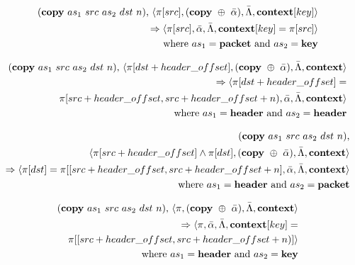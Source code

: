 \begin{equation}
\begin{split}
  (\textrm{\textbf{copy}} \ as_1 \ src \ as_2 \ dst \ n)
  \textrm{,} \ \langle \pi[src], (\textrm{\textbf{copy}} \ \oplus \ \bar \alpha), \bar \Lambda, \textrm{\textbf{context}}[key] \rangle \\
  \Rightarrow
  \langle \pi[src], \bar \alpha, \bar \Lambda, \textrm{\textbf{context}}[key] = \pi[src] \rangle \\
    \textrm{where} \ as_1 = \textrm{\textbf{packet} and } as_2 =
    \textrm{\textbf{key}}
\end{split}
\end{equation}

\begin{equation}
\begin{split}
  (\textrm{\textbf{copy}} \ as_1 \ src \ as_2 \ dst \ n)
  \textrm{,} \ \langle \pi[dst + header\_offset], (\textrm{\textbf{copy}} \ \oplus \ \bar \alpha), \bar \Lambda, \textrm{\textbf{context}} \rangle \\
  \Rightarrow
  \langle \pi[dst + header\_offset] = \\ \pi[src + header\_offset, src + header\_offset + n),
  \bar \alpha, \bar \Lambda, \textrm{\textbf{context}} \rangle \\
    \textrm{where} \ as_1 = \textrm{\textbf{header} and } as_2 =
    \textrm{\textbf{header}}
\end{split}
\end{equation}

\begin{equation}
\begin{split}
  (\textrm{\textbf{copy}} \ as_1 \ src \ as_2 \ dst \ n)
  \textrm{,} \\ \langle \pi[src + header\_offset] \wedge \pi[dst], (\textrm{\textbf{copy}} \ \oplus \ \bar \alpha), \bar \Lambda, \textrm{\textbf{context}} \rangle \\  
  \Rightarrow
  \langle \pi[dst] = \pi[[src + header\_offset, src + header\_offset + n], \bar \alpha, \bar \Lambda, \textrm{\textbf{context}} \rangle \\  
    \textrm{where} \ as_1 = \textrm{\textbf{header} and } as_2 =
    \textrm{\textbf{packet}}
\end{split}
\end{equation}

\begin{equation}
\begin{split}
  (\textrm{\textbf{copy}} \ as_1 \ src \ as_2 \ dst \ n)
  \textrm{,} \ \langle \pi, (\textrm{\textbf{copy}} \ \oplus \ \bar \alpha), \bar \Lambda, \textrm{\textbf{context}} \rangle \\
  \Rightarrow
  \langle \pi, \bar \alpha, \bar \Lambda, \textrm{\textbf{context}}[key] = \\\pi[[src + header\_offset, src + header\_offset + n)] \rangle \\
    \textrm{where} \ as_1 = \textrm{\textbf{header} and } as_2 =
    \textrm{\textbf{key}}
\end{split}
\end{equation}

